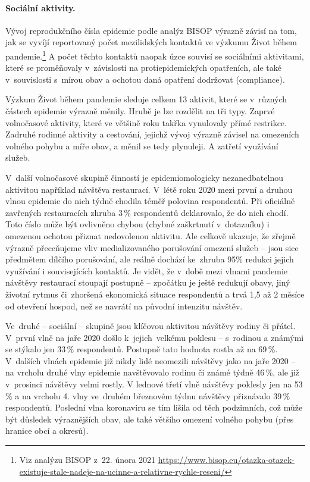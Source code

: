 \label{Socialni_aktivity}

\paragraph{Sociální aktivity.} Vývoj reprodukčního čísla epidemie podle analýz BISOP výrazně závisí na tom, jak se vyvíjí reportovaný počet mezilidských kontaktů ve výzkumu Život během pandemie.\footnote{Viz analýzu BISOP z 22. února 2021
\url{https://www.bisop.eu/otazka-otazek-existuje-stale-nadeje-na-ucinne-a-relativne-rychle-reseni/}} A počet těchto kontaktů naopak úzce souvisí se sociálními aktivitami, které se proměňovaly v závislosti na protiepidemických opatřeních, ale také v souvislosti s mírou obav a ochotou daná opatření dodržovat (compliance).

Výzkum Život během pandemie sleduje celkem 13 aktivit, které se v různých částech epidemie výrazně měnily. Hrubě je lze rozdělit na tři typy. Zaprvé volnočasové aktivity, které ve většině roku takřka vynulovaly přímé restrikce. Zadruhé rodinné aktivity a cestování, jejichž vývoj výrazně závisel na omezeních volného pohybu a míře obav, a měnil se tedy plynuleji. A zatřetí využívání služeb.

V další volnočasové skupině činností je epidemiomologicky nezanedbatelnou aktivitou například návštěva restaurací. V létě roku 2020 mezi první a druhou vlnou epidemie do nich týdně chodila téměř polovina respondentů. Při oficiálně zavřených restauracích zhruba 3\,\% respondentů deklarovalo, že do nich chodí. Toto číslo může být ovlivněno chybou (chybné zaškrtnutí v dotazníku) i omezenou ochotou přiznat nedovolenou aktivitu. Ale celkově ukazuje, že zřejmě výrazně přeceňujeme vliv medializovaného porušování omezení služeb – jsou sice předmětem dílčího porušování, ale reálně dochází ke zhruba 95\% redukci jejich využívání i souvisejících kontaktů. Je vidět, že v době mezi vlnami pandemie návštěvy restaurací stoupají postupně – zpočátku je ještě redukují obavy, jiný životní rytmus či zhoršená ekonomická situace respondentů a trvá 1,5 až 2 měsíce od otevření hospod, než se navrátí na původní intenzitu návštěv.

Ve druhé – sociální – skupině jsou klíčovou aktivitou návštěvy rodiny či přátel. V první vlně na jaře 2020 došlo k jejich velkému poklesu – s rodinou a známými se stýkalo jen 33\,\% respondentů. Postupně tato hodnota rostla až na 69\,\%. V dalších vlnách epidemie
již nikdy lidé neomezili návštěvy jako na jaře 2020 – na vrcholu druhé vlny epidemie navštěvovalo rodinu či známé týdně 46\,\%, ale již v prosinci návštěvy velmi rostly. V lednové třetí vlně návštěvy poklesly jen na 53\,\% a na vrcholu 4. vlny ve druhém březnovém týdnu návštěvy přiznávalo 39\,\% respondentů. Poslední vlna koronaviru se tím lišila od těch podzimních, což může být důsledek výraznějších obav, ale také většího omezení volného pohybu (přes hranice obcí a okresů).

